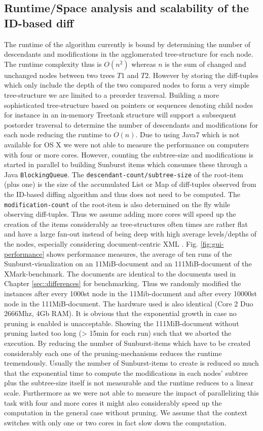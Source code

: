 \subsection{Runtime/Space analysis and scalability of the ID-based diff}
The runtime of the algorithm currently is bound by determining the number of descendants and modifications in the agglomerated tree-structure for each node. The runtime complexity thus is $O(n^2)$ whereas $n$ is the sum of changed and unchanged nodes between two trees $T1$ and $T2$. However by storing the diff-tuples which only include the depth of the two compared nodes to form a very simple tree-structure we are limited to a preorder traversal. Building a more sophisticated tree-structure based on pointers or sequences denoting child nodes for instance in an in-memory Treetank structure will support a subsequent postorder traversal to determine the number of descendants and modifications for each node reducing the runtime to $O(n)$. Due to using Java7 which is not available for OS X we were not able to measure the performance on computers with four or more cores. However, counting the subtree-size and modifications is started in parallel to building Sunburst items which consumes these through a Java \texttt{BlockingQueue}. The \texttt{descendant-count/subtree-size} of the root-item (plus one) is the size of the accumulated List or Map of diff-tuples observed from the ID-based diffing algorithm and thus does not need to be computed. The \texttt{modification-count} of the root-item is also determined on the fly while observing diff-tuples. Thus we assume adding more cores will speed up the creation of the items considerably as tree-structures often times are rather flat and have a large fan-out instead of being deep with high average levels/depths of the nodes, especially considering document-centric XML \cite{ronnau2009efficient}. Fig. \ref{fig:gui-performance} shows performance measures, the average of ten runs of the Sunburst-visualization on an 11MiB-document and an 111MiB-document of the XMark-benchmark.  The documents are identical to the documents used in Chapter \ref{sec::differences} for benchmarking. Thus we randomly modified the instances after every 1000st node in the 11Mib-document and after every 10000st node in the 111MiB-document. The hardware used is also identical (Core 2 Duo 2666Mhz, 4Gb RAM). It is obvious that the exponential growth in case no pruning is enabled is unacceptable. Showing the 111MiB-document without pruning lasted too long (> 15min for each run) such that we aborted the execution. By reducing the number of Sunburst-items which have to be created considerably each one of the pruning-mechanisms reduces the runtime tremendously. Usually the number of Sunburst-items to create is reduced so much that the exponential time to compute the modifications in each nodes' subtree plus the subtree-size itself is not measurable and the runtime reduces to a linear scale. Furthermore as we were not able to measure the impact of parallelizing this task with four and more cores it might also considerably speed up the computation in the general case without pruning. We assume that the context switches with only one or two cores in fact slow down the computation. 

